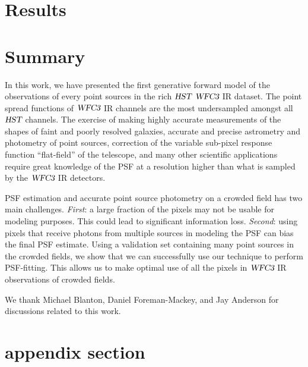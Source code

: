 \documentclass[onecolumn]{aastex61}
\newcommand{\project}[1]{{\textsl{#1}}}
\newcommand{\hst}{\project{HST}}
\newcommand{\wfc}{\project{WFC3}}
\begin{document}


\section{Results}\label{sec:hstresults}

\section{Summary}\label{sec:hstsummary}
In this work, we have presented the first generative forward model of the observations of every point sources in the rich $\hst$ $\wfc$ IR dataset. 
The point spread functions of $\wfc$ IR channels are the most undersampled amongst all $\hst$ channels. 
The exercise of making highly accurate measurements of the shapes of faint and poorly resolved galaxies, accurate and precise astrometry and photometry of point sources, 
correction of the variable sub-pixel response function ``flat-field'' of the telescope, and many other scientific applications require great knowledge of 
the PSF at a resolution higher than what is sampled by the $\wfc$ IR detectors. 

PSF estimation and accurate point source photometry on a crowded field has two main challenges. \emph{First}: a large fraction of the pixels may not be usable for modeling purposes. This could lead to  significant information loss. \emph{Second}: using pixels that receive photons from multiple sources in modeling the PSF can bias the final PSF estimate. 
Using a validation set containing many point sources in the crowded fields, we show that we can successfully use our technique to perform PSF-fitting. 
This allows us to make optimal use of all the pixels in $\wfc$ IR observations of crowded fields.

\acknowledgments
We thank Michael Blanton, Daniel Foreman-Mackey, and Jay Anderson for discussions related to this work.  




\appendix
\section{appendix section}
\end{document}
